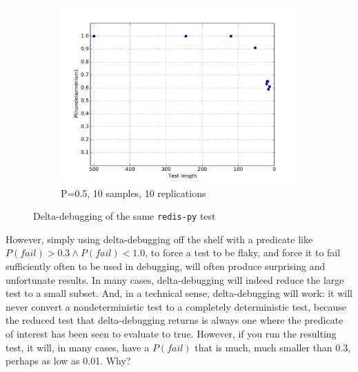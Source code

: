 \begin{figure}
\begin{subfigure}{0.67\columnwidth}
\includegraphics[width=\columnwidth]{lengthddminforceprep}
\caption{P=0.5, 10 samples, 10 replications}
\label{fig:p3}
\end{subfigure}
\caption{Delta-debugging of the same {\tt redis-py} test}
\end{figure}

However, simply using delta-debugging off the shelf with a predicate
like $P(fail) > 0.3 \wedge P(fail) < 1.0$, to force a test to be flaky, and force it to fail
sufficiently often to be used in debugging, will often produce
surprising and unfortunate results.  In many cases,
delta-debugging will indeed reduce the large test to a small subset.
And, in a technical sense, delta-debugging will work:  it will never
convert a nondeterministic test to a completely deterministic test,
because the reduced test that delta-debugging returns is always one
where the predicate of interest has been seen to evaluate to true.
However, if you run the resulting test, it will, in many cases, have a
$P(fail)$ that is much, much smaller than
0.3, perhaps as low as 0.01.  Why?

